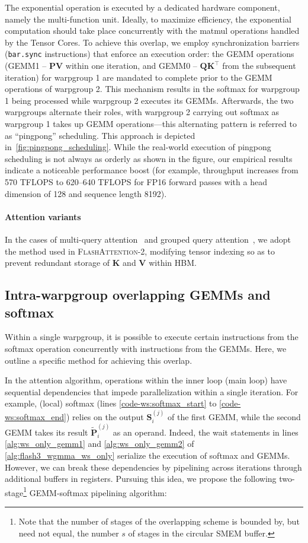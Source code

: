 The exponential operation is executed by a dedicated hardware component, namely the multi-function unit. Ideally, to maximize efficiency, the exponential computation should take place concurrently with the matmul operations handled by the Tensor Cores. To achieve this overlap, we employ synchronization barriers (\texttt{bar.sync} instructions) that enforce an execution order: the GEMM operations (GEMM1 -- $\mathbf{P} \mathbf{V}$ within one iteration, and GEMM0 -- $\mathbf{Q} \mathbf{K}^\top$ from the subsequent iteration) for warpgroup 1 are mandated to complete prior to the GEMM operations of warpgroup 2. This mechanism results in the softmax for warpgroup 1 being processed while warpgroup 2 executes its GEMMs. Afterwards, the two warpgroups alternate their roles, with warpgroup 2 carrying out softmax as warpgroup 1 takes up GEMM operations—this alternating pattern is referred to as ``pingpong'' scheduling. This approach is depicted in~\cref{fig:pingpong_scheduling}. While the real-world execution of pingpong scheduling is not always as orderly as shown in the figure, our empirical results indicate a noticeable performance boost (for example, throughput increases from 570 TFLOPS to 620–640 TFLOPS for FP16 forward passes with a head dimension of 128 and sequence length 8192).

\paragraph{Attention variants} In the cases of multi-query attention~\citep{shazeer2019fast} and grouped query attention~\citep{ainslie2023gqa}, we adopt the method used in \textsc{FlashAttention-2}, modifying tensor indexing so as to prevent redundant storage of $\mathbf{K}$ and $\mathbf{V}$ within HBM.

\subsection{Intra-warpgroup overlapping GEMMs and softmax}

Within a single warpgroup, it is possible to execute certain instructions from the softmax operation concurrently with instructions from the GEMMs. Here, we outline a specific method for achieving this overlap.

In the attention algorithm, operations within the inner loop (main loop) have sequential dependencies that impede parallelization within a single iteration. For example, (local) softmax (lines \ref{code-ws:softmax_start} to \ref{code-ws:softmax_end}) relies on the output $\mathbf{S}_i^{(j)}$ of the first GEMM, while the second GEMM takes its result $\widetilde{\mathbf{P}}_i^{(j)}$ as an operand. Indeed, the wait statements in lines \ref{alg:ws_only_gemm1} and \ref{alg:ws_only_gemm2} of \cref{alg:flash3_wgmma_ws_only} serialize the execution of softmax and GEMMs. However, we can break these dependencies by pipelining across iterations through additional buffers in registers. Pursuing this idea, we propose the following two-stage\footnote{Note that the number of stages of the overlapping scheme is bounded by, but need not equal, the number $s$ of stages in the circular SMEM buffer.} GEMM-softmax pipelining algorithm:

